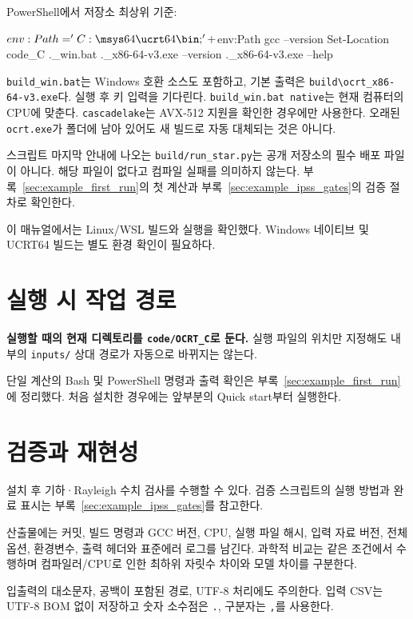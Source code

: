 PowerShell에서 저장소 최상위 기준:


\par\noindent\begin{minipage}{\linewidth}
\begin{ManualCode}
$env:Path = 'C:\msys64\ucrt64\bin;' + $env:Path
gcc --version
Set-Location code\OCRT_C
.\build_win.bat
.\build\ocrt_x86-64-v3.exe --version
.\build\ocrt_x86-64-v3.exe --help
\end{ManualCode}
\end{minipage}\par

\texttt{build\_\allowbreak{}win.\allowbreak{}bat}는 Windows 호환 소스도 포함하고, 기본 출력은 \texttt{build\textbackslash{}ocrt\_\allowbreak{}x86-\allowbreak{}64-\allowbreak{}v3.\allowbreak{}exe}다. 실행 후 키 입력을 기다린다. \texttt{build\_\allowbreak{}win.\allowbreak{}bat native}는 현재 컴퓨터의 CPU에 맞춘다. \texttt{cascadelake}는 AVX-512 지원을 확인한 경우에만 사용한다. 오래된 \texttt{ocrt.\allowbreak{}exe}가 폴더에 남아 있어도 새 빌드로 자동 대체되는 것은 아니다.

스크립트 마지막 안내에 나오는 \texttt{build/\allowbreak{}run\_\allowbreak{}star.\allowbreak{}py}는 공개 저장소의 필수 배포 파일이 아니다. 해당 파일이 없다고 컴파일 실패를 의미하지 않는다. 부록~\ref{sec:example_first_run}의 첫 계산과 부록~\ref{sec:example_ipss_gates}의 검증 절차로 확인한다.

이 매뉴얼에서는 Linux/WSL 빌드와 실행을 확인했다. Windows 네이티브 및 UCRT64 빌드는 별도 환경 확인이 필요하다.

\section{실행 시 작업 경로}
\label{sec:auto:02_installation:5}
\textbf{실행할 때의 현재 디렉토리를 \texttt{code/\allowbreak{}OCRT\_\allowbreak{}C}로 둔다.} 실행 파일의 위치만 지정해도 내부의 \texttt{inputs/\allowbreak{}} 상대 경로가 자동으로 바뀌지는 않는다.

단일 계산의 Bash 및 PowerShell 명령과 출력 확인은 부록~\ref{sec:example_first_run}에 정리했다. 처음 설치한 경우에는 앞부분의 Quick start부터 실행한다.

\section{검증과 재현성}
\label{sec:auto:02_installation:6}
설치 후 기하·Rayleigh 수치 검사를 수행할 수 있다. 검증 스크립트의 실행 방법과 완료 표시는 부록~\ref{sec:example_ipss_gates}를 참고한다.

산출물에는 커밋, 빌드 명령과 GCC 버전, CPU, 실행 파일 해시, 입력 자료 버전, 전체 옵션, 환경변수, 출력 헤더와 표준에러 로그를 남긴다. 과학적 비교는 같은 조건에서 수행하며 컴파일러/CPU로 인한 최하위 자릿수 차이와 모델 차이를 구분한다.

입출력의 대소문자, 공백이 포함된 경로, UTF-8 처리에도 주의한다. 입력 CSV는 UTF-8 BOM 없이 저장하고 숫자 소수점은 \texttt{.\allowbreak{}}, 구분자는 \texttt{,\allowbreak{}}를 사용한다.

\endgroup


